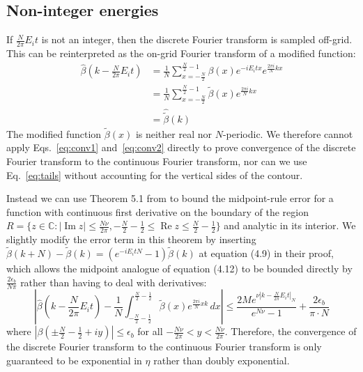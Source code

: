 \documentclass[aps,floatfix,10pt,amssymb,amsfont,amsmath,superscriptaddress,float,nofootinbib,longbibliography,nobalancelastpage,twocolumn]{revtex4-2}
\begin{document}
\subsection{Non-integer energies}
If $\frac{N}{2\pi}E_it$ is not an integer, then the discrete Fourier transform is sampled off-grid. This can be reinterpreted as the on-grid Fourier transform of a modified function:
\begin{align}
    \hat \beta(k -\frac{N}{2\pi}E_it) &= \frac{1}{N} \sum_{x=-\frac{N}{2}}^{\frac{N}{2}-1} \beta(x) e^{-iE_it x}e^{\frac{2\pi i}{N} kx}\\
    &= \frac{1}{N} \sum_{x=-\frac{N}{2}}^{\frac{N}{2}-1} \tilde\beta(x)e^{\frac{2\pi i}{N} kx}\\
    &= \hat{\tilde\beta}(k)
\end{align}
The modified function $\tilde\beta(x)$ is neither real nor $N$-periodic. We therefore cannot apply Eqs.~\eqref{eq:conv1} and~\eqref{eq:conv2} directly to prove convergence of the discrete Fourier transform to the continuous Fourier transform, nor can we use Eq.~\eqref{eq:tails} without accounting for the vertical sides of the contour.

Instead we can use Theorem 5.1 from \cite{javed2014trapezoidal} to bound the midpoint-rule error for a function with continuous first derivative on the boundary of the region $R = \{z \in \mathbb{C}: |\operatorname{Im} z| \leq  \frac{N\nu}{2\pi}, -\frac{N}{2}-\frac{1}{2}\leq\operatorname{Re} z \leq \frac{N}{2}-\frac{1}{2}\}$ and analytic in its interior. We slightly modify the error term in this theorem by inserting $\tilde \beta(k+N)- \tilde \beta(k)= (e^{-iE_i tN}-1)\tilde \beta(k)$ at equation (4.9) in their proof, which allows the midpoint analogue of equation (4.12) to be bounded directly by $\frac{2\epsilon_b}{N\pi}$ rather than having to deal with derivatives:
\begin{equation}
    \left| \hat \beta\!\left(k-\frac{N}{2\pi}E_it\right) - \frac{1}{N} \int_{-\frac{N}{2}-\frac{1}{2}}^{\frac{N}{2}-\frac{1}{2}}\tilde\beta(x)e^{\frac{2\pi i}{N}xk}\,dx \right| \leq \frac{2 Me^{\nu|k-\frac{N}{2\pi}E_i t|_{N}}}{e^{N\nu}-1} + \frac{2\epsilon_{b}}{\pi\cdot N}
    \label{eq:noninteger1}
\end{equation}
where $|\beta(\pm\frac{N}{2}-\frac{1}{2}+iy)| \leq \epsilon_{b}$ for all $-\frac{N\nu}{2\pi}<y<\frac{N\nu}{2\pi}$. Therefore, the convergence of the discrete Fourier transform to the continuous Fourier transform is only guaranteed to be exponential in $\eta$ rather than doubly exponential.
\end{document}
